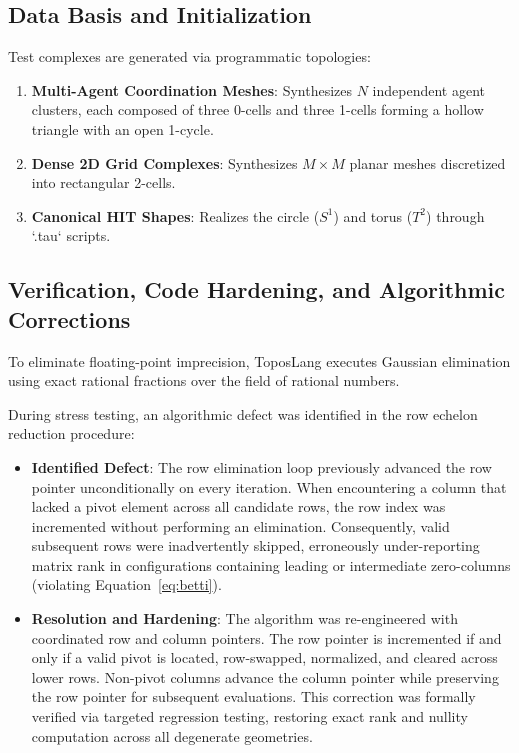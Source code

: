 \documentclass[10pt,a4paper]{article}
\begin{document}
\subsection{Data Basis and Initialization}
Test complexes are generated via programmatic topologies:
\begin{enumerate}
    \item \textbf{Multi-Agent Coordination Meshes}: Synthesizes $N$ independent agent clusters, each composed of three 0-cells and three 1-cells forming a hollow triangle with an open 1-cycle.
    \item \textbf{Dense 2D Grid Complexes}: Synthesizes $M \times M$ planar meshes discretized into rectangular 2-cells.
    \item \textbf{Canonical HIT Shapes}: Realizes the circle ($S^1$) and torus ($T^2$) through `.tau` scripts.
\end{enumerate}

\subsection{Verification, Code Hardening, and Algorithmic Corrections}
To eliminate floating-point imprecision, ToposLang executes Gaussian elimination using exact rational fractions over the field of rational numbers.

During stress testing, an algorithmic defect was identified in the row echelon reduction procedure:
\begin{itemize}
    \item \textbf{Identified Defect}: The row elimination loop previously advanced the row pointer unconditionally on every iteration. When encountering a column that lacked a pivot element across all candidate rows, the row index was incremented without performing an elimination. Consequently, valid subsequent rows were inadvertently skipped, erroneously under-reporting matrix rank in configurations containing leading or intermediate zero-columns (violating Equation~\ref{eq:betti}).
    \item \textbf{Resolution and Hardening}: The algorithm was re-engineered with coordinated row and column pointers. The row pointer is incremented if and only if a valid pivot is located, row-swapped, normalized, and cleared across lower rows. Non-pivot columns advance the column pointer while preserving the row pointer for subsequent evaluations. This correction was formally verified via targeted regression testing, restoring exact rank and nullity computation across all degenerate geometries.
\end{itemize}
\end{document}
